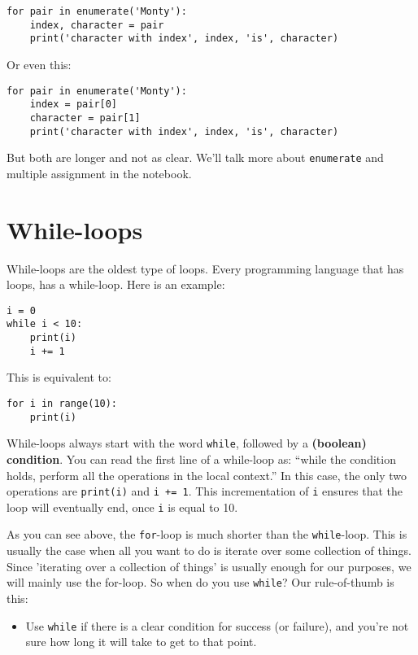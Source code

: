 \documentclass[12pt]{book}
\begin{document}
\begin{lstlisting}
for pair in enumerate('Monty'):
    index, character = pair
    print('character with index', index, 'is', character)
\end{lstlisting}

Or even this:

\begin{lstlisting}
for pair in enumerate('Monty'):
    index = pair[0]
    character = pair[1]
    print('character with index', index, 'is', character)
\end{lstlisting}

But both are longer and not as clear. We'll talk more about \texttt{enumerate} and multiple assignment in the notebook.

\section{While-loops}

While-loops are the oldest type of loops. Every programming language that has loops, has a while-loop. Here is an example:

\begin{lstlisting}
i = 0
while i < 10:
	print(i)
	i += 1
\end{lstlisting}

This is equivalent to:

\begin{lstlisting}
for i in range(10):
	print(i)
\end{lstlisting}

While-loops always start with the word \texttt{while}, followed by a \textbf{(boolean) condition}. You can read the first line of a while-loop as: ``while the condition holds, perform all the operations in the local context.'' In this case, the only two operations are \texttt{print(i)} and \texttt{i += 1}. This incrementation of \texttt{i} ensures that the loop will eventually end, once \texttt{i} is equal to 10.

As you can see above, the \texttt{for}-loop is much shorter than the \texttt{while}-loop. This is usually the case when all you want to do is iterate over some collection of things. Since 'iterating over a collection of things' is usually enough for our purposes, we will mainly use the for-loop. So when do you use \texttt{while}? Our rule-of-thumb is this:
\begin{itemize}
\item Use \texttt{while} if there is a clear condition for success (or failure), and you're not sure how long it will take to get to that point.
\end{itemize}
\end{document}
